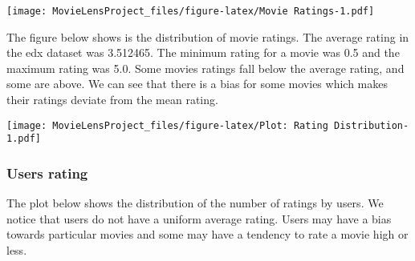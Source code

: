\documentclass[
]{article}
\newenvironment{Shaded}{\begin{snugshade}}{\end{snugshade}}
\newcommand{\AttributeTok}[1]{\textcolor[rgb]{0.77,0.63,0.00}{#1}}
\newcommand{\CommentTok}[1]{\textcolor[rgb]{0.56,0.35,0.01}{\textit{#1}}}
\newcommand{\DecValTok}[1]{\textcolor[rgb]{0.00,0.00,0.81}{#1}}
\newcommand{\FloatTok}[1]{\textcolor[rgb]{0.00,0.00,0.81}{#1}}
\newcommand{\FunctionTok}[1]{\textcolor[rgb]{0.00,0.00,0.00}{#1}}
\newcommand{\NormalTok}[1]{#1}
\newcommand{\OtherTok}[1]{\textcolor[rgb]{0.56,0.35,0.01}{#1}}
\newcommand{\SpecialCharTok}[1]{\textcolor[rgb]{0.00,0.00,0.00}{#1}}
\newcommand{\StringTok}[1]{\textcolor[rgb]{0.31,0.60,0.02}{#1}}
\begin{document}
\texttt{[image: MovieLensProject\_files/figure-latex/Movie Ratings-1.pdf]}

The figure below shows is the distribution of movie ratings. The average
rating in the edx dataset was 3.512465. The minimum rating for a movie
was 0.5 and the maximum rating was 5.0. Some movies ratings fall below
the average rating, and some are above. We can see that there is a bias
for some movies which makes their ratings deviate from the mean rating.

\begin{Shaded}
\end{Shaded}

\texttt{[image: MovieLensProject\_files/figure-latex/Plot: Rating Distribution-1.pdf]}

\hypertarget{users-rating}{%
\subsubsection{Users rating}\label{users-rating}}

The plot below shows the distribution of the number of ratings by users.
We notice that users do not have a uniform average rating. Users may
have a bias towards particular movies and some may have a tendency to
rate a movie high or less.
\end{document}
